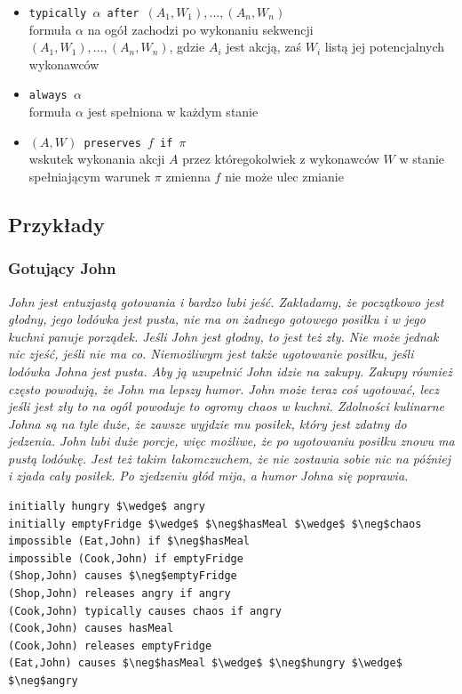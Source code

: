 \documentclass{article}
\begin{document}
\begin{itemize}
\item {\large\texttt{typically $\alpha$ after $(A_{1},W_{1}), ..., (A_{n},W_{n})$}}\\
formuła $\alpha$ na ogół zachodzi po wykonaniu sekwencji $(A_{1},W_{1}), ..., (A_{n},W_{n})$, gdzie $A_{i}$ jest akcją, zaś $W_{i}$ listą jej potencjalnych wykonawców
\item {\large\texttt{always $\alpha$}}\\
formuła $\alpha$ jest spełniona w każdym stanie
\item {\large\texttt{$(A,W)$ preserves $f$ if $\pi$}}\\
wskutek wykonania akcji $A$ przez któregokolwiek z wykonawców $W$ w stanie spełniającym warunek $\pi$ zmienna $f$ nie może ulec zmianie
\end{itemize}

\subsection{Przykłady} 
\subsubsection{Gotujący John}


\textit{John jest entuzjastą gotowania i bardzo lubi jeść. Zakładamy, że początkowo jest głodny, jego lodówka jest pusta, nie ma on żadnego gotowego posiłku i w jego kuchni panuje porządek. Jeśli John jest głodny, to jest też zły. Nie może jednak nic zjeść, jeśli nie ma co. Niemożliwym jest także ugotowanie posiłku, jeśli lodówka Johna jest pusta. Aby ją uzupełnić John idzie na zakupy. Zakupy również często powodują, że John ma lepszy humor. John może teraz coś ugotować, lecz jeśli jest zły to na ogół powoduje to ogromy chaos w kuchni. Zdolności kulinarne Johna są na tyle duże, że zawsze wyjdzie mu posiłek, który jest zdatny do jedzenia. John lubi duże porcje, więc możliwe, że po ugotowaniu posiłku znowu ma pustą lodówkę. Jest też takim łakomczuchem, że nie zostawia sobie nic na później i zjada cały posiłek. Po zjedzeniu głód mija, a humor Johna się poprawia.}

\bigskip
{}
\begin{lstlisting}[mathescape=true]
initially hungry $\wedge$ angry
initially emptyFridge $\wedge$ $\neg$hasMeal $\wedge$ $\neg$chaos 
impossible (Eat,John) if $\neg$hasMeal 
impossible (Cook,John) if emptyFridge
(Shop,John) causes $\neg$emptyFridge
(Shop,John) releases angry if angry
(Cook,John) typically causes chaos if angry
(Cook,John) causes hasMeal 
(Cook,John) releases emptyFridge 
(Eat,John) causes $\neg$hasMeal $\wedge$ $\neg$hungry $\wedge$ $\neg$angry
\end{lstlisting}
\end{document}

